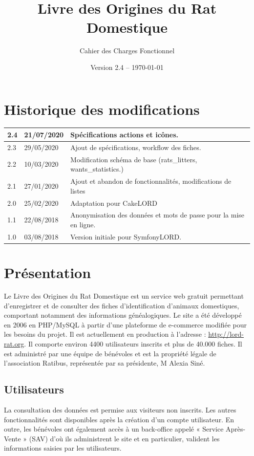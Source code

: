 ﻿\documentclass[a4paper,10pt]{article}
\title{Livre des Origines du Rat Domestique}
\author{Cahier des Charges Fonctionnel}
\date{Version 2.4 -- \today}
\begin{document}
\maketitle

\section*{Historique des modifications}

\large
\noindent\begin{tabularx}{\textwidth}{|l|l|X|}\hline
\textbf{2.4} & \textbf{21/07/2020} & Spécifications actions et icônes.\\\hline
2.3 & 29/05/2020 & Ajout de spécifications, workflow des fiches.\\\hline
2.2 & 10/03/2020 & Modification schéma de base (rats\_litters, wants\_statistics.)\\\hline
2.1 & 27/01/2020 & Ajout et abandon de fonctionnalités, modifications de listes\\\hline
2.0 & 25/02/2020 & Adaptation pour CakeLORD\\\hline
1.1 & 22/08/2018 & Anonymisation des données et mots de passe pour la mise en ligne.\\\hline
1.0 & 03/08/2018 & Version initiale pour SymfonyLORD.\\\hline
\end{tabularx}
\normalsize

\vfill

\tableofcontents

\section{Présentation}
Le Livre des Origines du Rat Domestique est un service web gratuit permettant d'enregistrer et de consulter des fiches d'identification d'animaux domestiques, comportant notamment des informations généalogiques. Le site a été développé en 2006 en PHP/MySQL à partir d'une plateforme de e-commerce modifiée pour les besoins du projet. Il est actuellement en production à l'adresse : \url{http://lord-rat.org}. Il comporte environ 4400 utilisateurs inscrits et plus de 40.000 fiches. Il est administré par une équipe de bénévoles et est la propriété légale de l'association Ratibus, représentée par sa présidente, M Alexia Siné.

\subsection{Utilisateurs}
La consultation des données est permise aux visiteurs non inscrits. Les autres fonctionnalités sont disponibles après la création d'un compte utilisateur. En outre, les bénévoles ont également accès à un back-office appelé « Service Après-Vente » (SAV) d'où ils administrent le site et en particulier, valident les informations saisies par les utilisateurs.
\end{document}
